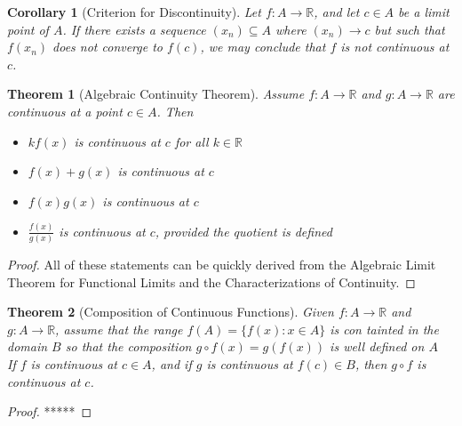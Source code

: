 \documentclass[10pt]{report}
\newtheorem{thm2}{Theorem}[section]
\newtheorem{cor2}{Corollary}[section]
\begin{document}
\begin{cor2}[Criterion for Discontinuity]
Let $f:A\to\mathbb{R}$, and let $c\in A$ be a limit point of $A$. If there exists a sequence $(x_n)\subseteq A$ where $(x_n)\to c$ but such that $f(x_n)$ does not converge to $f(c)$, we may conclude that $f$ is not continuous at $c$.
\end{cor2}
\begin{thm2}[Algebraic Continuity Theorem]
Assume $f:A\to\mathbb{R}$ and $g:A\to\mathbb{R}$ are continuous at a point $c\in A$. Then
\begin{itemize}
\item[(i)] $kf(x)$ is continuous at $c$ for all $k\in\mathbb{R}$
\item[(ii)] $f(x)+g(x)$ is continuous at $c$
\item[(iii)] $f(x)g(x)$ is continuous at $c$
\item[(iv)] $\frac{f(x)}{g(x)}$ is continuous at $c$, provided the quotient is defined
\end{itemize}
\end{thm2}
\begin{proof}
All of these statements can be quickly derived from the Algebraic Limit Theorem for Functional Limits and the Characterizations of Continuity.
\end{proof}
\begin{thm2}[Composition of Continuous Functions]
Given $f:A\to\mathbb{R}$ and $g:A\to\mathbb{R}$, assume that the range $f(A) = \{f(x): x\in A\}$ is con tainted in the domain $B$ so that the composition $g\circ f(x) = g(f(x))$ is well defined on $A$\\
If $f$ is continuous at $c\in A$, and if $g$ is continuous at $f(c)\in B$, then $g\circ f$ is continuous at $c$.
\end{thm2}
\begin{proof}
*****
\end{proof}
\end{document}
